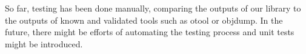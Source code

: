 
So far, testing has been done manually, comparing the outputs of our library
to the outputs of known and validated tools such as otool or objdump. In the
future, there might be efforts of automating the testing process and unit tests
might be introduced.

